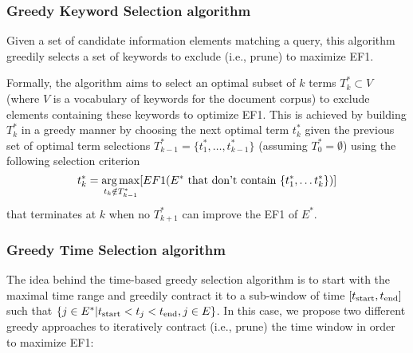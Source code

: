 \subsubsection{Greedy Keyword Selection algorithm}

Given a set of candidate information elements matching a query, this algorithm greedily selects a set of keywords to exclude (i.e., prune) to maximize EF1.

Formally, the algorithm aims to select an
optimal subset of $k$ terms $T_{k}^{*}\subset V$ (where $V$ is a vocabulary of keywords for the document corpus) to exclude elements containing these keywords to optimize EF1.  This is achieved by
building $T_{k}^{*}$ in a greedy manner by choosing the next optimal
term $t_{k}^{*}$ given the previous set of optimal term selections
$T_{k-1}^{*}=\{t_{1}^{*},\ldots,t_{k-1}^{*}\}$ (assuming $T_{0}^{*}=\emptyset$)
using the following selection criterion
\begin{equation}
t_{k}^{*}=\operatorname*{arg\,max}_{t_{k}\notin T_{k-1}^{*}} [EF1(E^{*} \textrm{ that don't contain } \{t_{1}^{*},\dots t_{k}^{*}\})] 
\end{equation}
that terminates at $k$ when no $T_{k+1}^{*}$ can improve the EF1 of $E^*$. 

\subsubsection{Greedy Time Selection algorithm}

The idea behind the time-based greedy selection algorithm is to start with the maximal time range and greedily contract it to a sub-window of time $[t_{\textrm{start}},t_{\textrm{end}}]$ such that $\{ j \in E^* | t_{\textrm{start}} < t_j < t_{\textrm{end}}, j \in E \}$.  In this case, we propose two different greedy approaches to iteratively contract (i.e., prune) the time window in order to maximize EF1:

